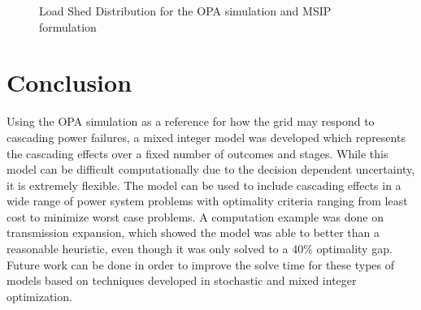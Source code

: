 \begin{figure}
 \centering
  \caption{Load Shed Distribution for the OPA simulation and MSIP formulation}
 \label{dist}
\end{figure}


\section{Conclusion}
Using the OPA simulation as a reference for how the grid may respond to cascading power failures, a mixed integer model was developed which represents the cascading effects over a fixed number of outcomes and stages.  While this model can be difficult computationally due to the decision dependent uncertainty, it is extremely flexible.  The model can be used to include cascading effects in a wide range of power system problems with optimality criteria ranging from least cost to minimize worst case problems.  A computation example was done on transmission expansion, which showed the model was able to better than a reasonable heuristic, even though it was only solved to a 40\% optimality gap.  Future work can be done in order to improve the solve time for these types of models based on techniques developed in stochastic and mixed integer optimization.


